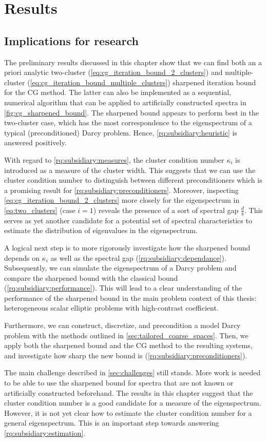 \chapter{Results}\label{ch:results}
\section{Implications for research}\label{sec:cg_sharpened_convrate_implications}
The preliminary results discussed in this chapter show that we can find both an a priori analytic two-cluster (\cref{eq:cg_iteration_bound_2_clusters}) and multiple-cluster (\cref{eq:cg_iteration_bound_multiple_clusters}) sharpened iteration bound for the CG method. The latter can also be implemented as a sequential, numerical algorithm that can be applied to artificially constructed spectra in \cref{fig:cg_sharpened_bound}. The sharpened bound appears to perform best in the two-cluster case, which has the most correspondence to the eigenspectrum of a typical (preconditioned) Darcy problem. Hence, \ref{rq:subsidiary:heuristic} is answered positively. 

With regard to \ref{rq:subsidiary:measures}, the cluster condition number $\kappa_i$ is introduced as a measure of the cluster width. This suggests that we can use the cluster condition number to distinguish between different preconditioners which is a promising result for \ref{rq:subsidiary:preconditioners}. Moreover, inspecting \cref{eq:cg_iteration_bound_2_clusters} more closely for the eigenspectrum in \cref{eq:two_clusters} (case $i=1$) reveals the presence of a sort of spectral gap $\frac{d}{b}$. This serves as yet another candidate for a potential set of spectral characteristics to estimate the distribution of eigenvalues in the eigenspectrum.

A logical next step is to more rigorously investigate how the sharpened bound depends on $\kappa_i$ as well as the spectral gap (\ref{rq:subsidiary:dependance}). Subsequently, we can simulate the eigenspectrum of a Darcy problem and compare the sharpened bound with the classical bound (\ref{rq:subsidiary:performance}). This will lead to a clear understanding of the performance of the sharpened bound in the main problem context of this thesis: heterogeneous scalar elliptic problems with high-contrast coefficient.

Furthermore, we can construct, discretize, and precondition a model Darcy problem with the methods outlined in \cref{sec:tailored_coarse_spaces}. Then, we apply both the sharpened bound and the CG method to the resulting systems, and investigate how sharp the new bound is (\ref{rq:subsidiary:preconditioners}).

The main challenge described in \cref{sec:challenges} still stands. More work is needed to be able to use the sharpened bound for spectra that are not known or artificially constructed beforehand. The results in this chapter suggest that the cluster condition number is a good candidate for a measure of the eigenspectrum. However, it is not yet clear how to estimate the cluster condition number for a general eigenspectrum. This is an important step towards answering \ref{rq:subsidiary:estimation}.